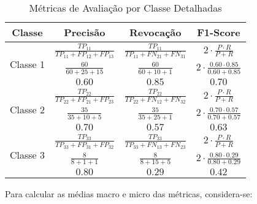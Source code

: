 \begin{table}[h]
\centering
\caption{Métricas de Avaliação por Classe Detalhadas}
\label{tab:detailed_evaluation_metrics}
\begin{tabular}{|c|c|c|c|}
\hline
\textbf{Classe} & \textbf{Precisão} & \textbf{Revocação} & \textbf{F1-Score} \\
\hline
\multirow{3}{*}{Classe 1} & \(\frac{TP_{11}}{TP_{11} + FP_{12} + FP_{13}}\) & \(\frac{TP_{11}}{TP_{11} + FN_{21} + FN_{31}}\) & \(2 \cdot \frac{P \cdot R}{P + R}\) \\
 & \(\frac{60}{60 + 25 + 15}\) & \(\frac{60}{60 + 10 + 1}\) & \(2 \cdot \frac{0.60 \cdot 0.85}{0.60 + 0.85}\) \\
 & \(0.60\) & \(0.85\) & \(0.70\) \\
\hline
\multirow{3}{*}{Classe 2} & \(\frac{TP_{22}}{TP_{22} + FP_{21} + FP_{23}}\) & \(\frac{TP_{22}}{TP_{22} + FN_{12} + FN_{32}}\) & \(2 \cdot \frac{P \cdot R}{P + R}\) \\
 & \(\frac{35}{35 + 10 + 5}\) & \(\frac{35}{35 + 25 + 1}\) & \(2 \cdot \frac{0.70 \cdot 0.57}{0.70 + 0.57}\) \\
 & \(0.70\) & \(0.57\) & \(0.63\) \\
\hline
\multirow{3}{*}{Classe 3} & \(\frac{TP_{33}}{TP_{33} + FP_{31} + FP_{32}}\) & \(\frac{TP_{33}}{TP_{33} + FN_{13} + FN_{23}}\) & \(2 \cdot \frac{P \cdot R}{P + R}\) \\
 & \(\frac{8}{8 + 1 + 1}\) & \(\frac{8}{8 + 15 + 5}\) & \(2 \cdot \frac{0.80 \cdot 0.29}{0.80 + 0.29}\) \\
 & \(0.80\) & \(0.29\) & \(0.42\) \\
\hline
\end{tabular}
\end{table}



Para calcular as médias macro e micro das métricas, considera-se:

